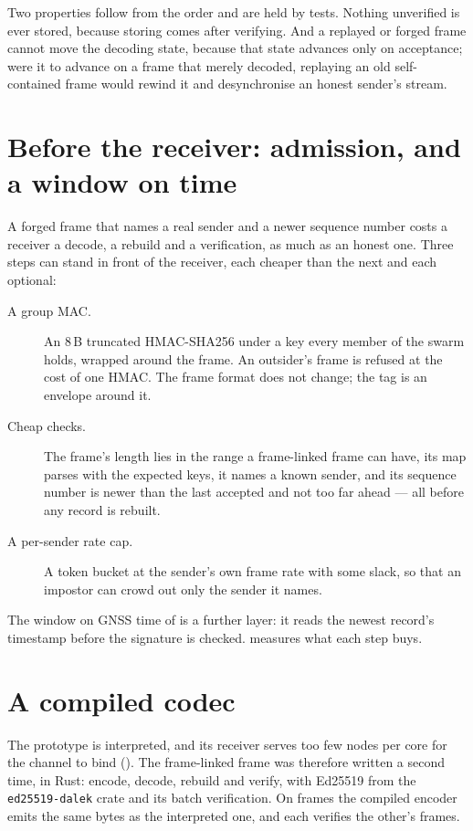 \vspace{0.5em}
\noindent Two properties follow from the order and are held by tests. Nothing unverified is
ever stored, because storing comes after verifying. And a replayed or forged frame cannot move
the decoding state, because that state advances only on acceptance; were it to advance on a
frame that merely decoded, replaying an old self-contained frame would rewind it and
desynchronise an honest sender's stream.

\section{Before the receiver: admission, and a window on time}\label{sec:admission}

A forged frame that names a real sender and a newer sequence number costs a receiver a decode, a
rebuild and a verification, as much as an honest one. Three steps can stand in front of the
receiver, each cheaper than the next and each optional:
\begin{description}
\item[A group MAC.] An $8$\,B truncated HMAC-SHA256 under a key every member of the swarm holds,
      wrapped around the frame. An outsider's frame is refused at the cost of one HMAC. The
      frame format does not change; the tag is an envelope around it.
\item[Cheap checks.] The frame's length lies in the range a frame-linked frame can have, its map parses
      with the expected keys, it names a known sender, and its sequence number is newer than the
      last accepted and not too far ahead --- all before any record is rebuilt.
\item[A per-sender rate cap.] A token bucket at the sender's own frame rate with some slack, so
      that an impostor can crowd out only the sender it names.
\end{description}
The window on GNSS time of  is a further layer: it reads the newest record's
timestamp before the signature is checked.  measures what each step buys.

\section{A compiled codec}\label{sec:compiled}

The prototype is interpreted, and its receiver serves too few nodes per core for the channel to
bind (). The frame-linked frame was therefore written a second time, in Rust: encode,
decode, rebuild and verify, with Ed25519 from the \texttt{ed25519-dalek} crate and its batch
verification. On \rustIdFrames{} frames the compiled encoder emits the same bytes as the
interpreted one, and each verifies the other's frames.


